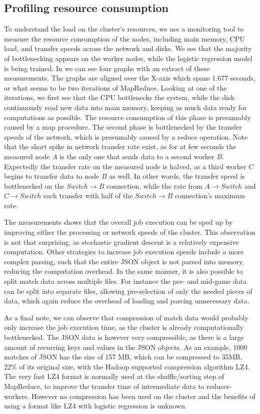 \subsection{Profiling resource consumption}\label{sec:profile}
To understand the load on the cluster's resources, we use a monitoring tool to measure the resource consumption of the nodes, including main memory, CPU load, and transfer speeds across the network and disks. We see that the majority of bottlenecking appears on the worker nodes, while the logistic regression model is being trained. In 
we can see four graphs with an extract of these measurements. The graphs are aligned over the X-axis which spans 1.677 seconds, or what seems to be two iterations of MapReduce. Looking at one of the iterations, we first see that the CPU bottlenecks the system, while the disk continuously read new data into main memory, keeping as much data ready for computations as possible. The resource consumption of this phase is presumably caused by a map procedure. The second phase is bottlenecked by the transfer speeds of the network, which is presumably caused by a reduce operation. Note that the short spike in network transfer rate exist, as for at few seconds the measured node $A$ is the only one that sends data to a second worker $B$. Expectedly the transfer rate on the measured node is halved, as a third worker $C$ begins to transfer data to node $B$ as well. In other words, the transfer speed is bottlenecked on the $Switch \rightarrow B$ connection, while the rate from $A \rightarrow Switch$ and $C \rightarrow Switch$ each transfer with half of the $Switch \rightarrow B$ connection's maximum rate.

The measurements shows that the overall job execution can be sped up by improving either the processing or network speeds of the cluster. This observation is not that surprising, as stochastic gradient descent is a relatively expensive computation. Other strategies to increase job execution speeds include a more complex parsing, such that the entire JSON object is not parsed into memory, reducing the computation overhead. In the same manner, it is also possible to split match data across multiple files. For instance the pre- and mid-game data can be split into separate files, allowing pre-selection of only the needed pieces of data, which again reduce the overhead of loading and parsing unnecessary data.

As a final note, we can observe that compression of match data would probably only increase the job execution time, as the cluster is already computationally bottlenecked. The JSON data is however very compressible, as there is a large amount of recurring keys and values in the JSON objects. As an example, 1000 matches of JSON has the size of 157 MB, which can be compressed to 35MB, 22\% of its original size, with the Hadoop supported compression algorithm LZ4. The very fast LZ4 format is normally used at the shuffle/sorting step of MapReduce, to improve the transfer time of intermediate data to reducer-workers. However no compression has been used on the cluster and the benefits of using a format like LZ4 with logistic regression is unknown.

%

\FloatBarrier



